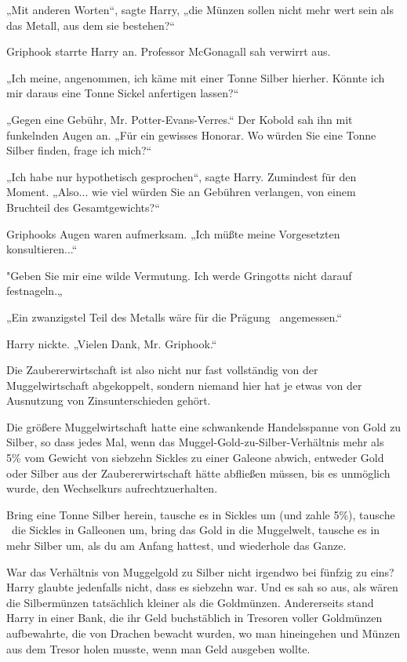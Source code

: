 {„Mit anderen Worten“, sagte Harry, „die Münzen sollen nicht mehr wert sein als das Metall, aus dem sie bestehen?“

Griphook starrte Harry an. Professor McGonagall sah verwirrt aus.

„Ich meine, angenommen, ich käme mit einer Tonne Silber hierher. Könnte ich mir daraus eine Tonne Sickel anfertigen lassen?“

„Gegen eine Gebühr, Mr. Potter-Evans-Verres.“ Der Kobold sah ihn mit funkelnden Augen an. „Für ein gewisses Honorar. Wo würden Sie eine Tonne Silber finden, frage ich mich?“

„Ich habe nur hypothetisch gesprochen“, sagte Harry. Zumindest für den Moment. „Also... wie viel würden Sie an Gebühren verlangen, von einem Bruchteil des Gesamtgewichts?“

Griphooks Augen waren aufmerksam. „Ich müßte meine Vorgesetzten konsultieren...“

"Geben Sie mir eine wilde Vermutung. Ich werde Gringotts nicht darauf festnageln.„

„Ein zwanzigstel Teil des Metalls wäre für die Prägung ~angemessen.“

Harry nickte. „Vielen Dank, Mr. Griphook.“

Die Zaubererwirtschaft ist also nicht nur fast vollständig von der Muggelwirtschaft abgekoppelt, sondern niemand hier hat je etwas von der Ausnutzung von Zinsunterschieden gehört.

Die größere Muggelwirtschaft hatte eine schwankende Handelsspanne von Gold zu Silber, so dass jedes Mal, wenn das Muggel-Gold-zu-Silber-Verhältnis mehr als 5\% vom Gewicht von siebzehn Sickles zu einer Galeone abwich, entweder Gold oder Silber aus der Zaubererwirtschaft hätte abfließen müssen, bis es unmöglich wurde, den Wechselkurs aufrechtzuerhalten.

Bring eine Tonne Silber herein, tausche es in Sickles um (und zahle 5\%), tausche ~die Sickles in Galleonen um, bring das Gold in die Muggelwelt, tausche es in mehr Silber um, als du am Anfang hattest, und wiederhole das Ganze.

War das Verhältnis von Muggelgold zu Silber nicht irgendwo bei fünfzig zu eins? Harry glaubte jedenfalls nicht, dass es siebzehn war. Und es sah so aus, als wären die Silbermünzen tatsächlich kleiner als die Goldmünzen. Andererseits stand Harry in einer Bank, die ihr Geld buchstäblich in Tresoren voller Goldmünzen aufbewahrte, die von Drachen bewacht wurden, wo man hineingehen und Münzen aus dem Tresor holen musste, wenn man Geld ausgeben wollte.

}
